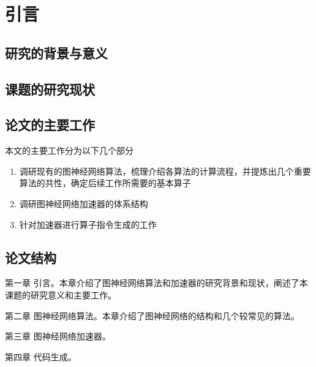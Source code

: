 
\chapter{引言}

\section{研究的背景与意义}

\section{课题的研究现状}

\section{论文的主要工作}

本文的主要工作分为以下几个部分
\begin{enumerate}
    \item 调研现有的图神经网络算法，梳理介绍各算法的计算流程，并提炼出几个重要算法的共性，确定后续工作所需要的基本算子
    \item 调研图神经网络加速器的体系结构
    \item 针对加速器进行算子指令生成的工作
\end{enumerate}

\section{论文结构}

第一章 引言。本章介绍了图神经网络算法和加速器的研究背景和现状，阐述了本课题的研究意义和主要工作。

第二章 图神经网络算法。本章介绍了图神经网络的结构和几个较常见的算法。

第三章 图神经网络加速器。

第四章 代码生成。